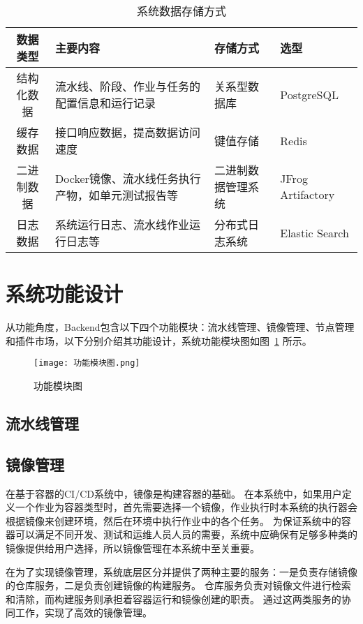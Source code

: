 \begin{table}[h]
  \centering
  \caption{系统数据存储方式}
  \label{tab:系统数据存储方式}
  \begin{tabular}{clll}
    \toprule
    数据类型 & 主要内容      & 存储方式   & 选型 \\
    \midrule
    结构化数据     & 流水线、阶段、作业与任务的配置信息和运行记录      & 关系型数据库   & PostgreSQL       \\
    缓存数据       & 接口响应数据，提高数据访问速度                   & 键值存储   & Redis       \\
    二进制数据     & Docker镜像、流水线任务执行产物，如单元测试报告等  & 二进制数据管理系统   & JFrog Artifactory   \\
    日志数据       & 系统运行日志、流水线作业运行日志等                & 分布式日志系统  & Elastic Search       \\
    \bottomrule
  \end{tabular}
\end{table}

\section{系统功能设计}

从功能角度，Backend包含以下四个功能模块：流水线管理、镜像管理、节点管理和插件市场，以下分别介绍其功能设计，系统功能模块图如图~\ref{fig:功能模块图} 所示。

\begin{figure}[h]
  \centering
  \texttt{[image: 功能模块图.png]}
  \caption{功能模块图}
  \label{fig:功能模块图}
\end{figure}

\subsection{流水线管理}

\subsection{镜像管理}
在基于容器的CI/CD系统中，镜像是构建容器的基础。
在本系统中，如果用户定义一个作业为容器类型时，首先需要选择一个镜像，作业执行时本系统的执行器会根据镜像来创建环境，然后在环境中执行作业中的各个任务。
为保证系统中的容器可以满足不同开发、测试和运维人员人员的需要，系统中应确保有足够多种类的镜像提供给用户选择，所以镜像管理在本系统中至关重要。

在为了实现镜像管理，系统底层区分并提供了两种主要的服务：一是负责存储镜像的仓库服务，二是负责创建镜像的构建服务。
仓库服务负责对镜像文件进行检索和清除，而构建服务则承担着容器运行和镜像创建的职责。
通过这两类服务的协同工作，实现了高效的镜像管理。

